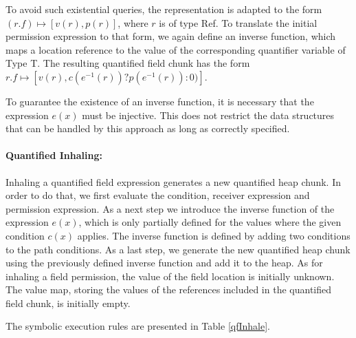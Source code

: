 \documentclass[12pt]{article}
\begin{document}
To avoid such existential queries, the representation is adapted to the form \((r.f) \mapsto [v(r), p(r)]\), where \(r\) is of type Ref. To translate the initial permission expression to that form, we again define an inverse function, which maps a location reference to the value of the corresponding quantifier variable of Type T. The resulting quantified field chunk has the form \(r.f \mapsto [v(r), c(e^{-1}(r)) ? p(e^{-1}(r)) : 0)]\). %

To guarantee the existence of an inverse function, it is necessary that the expression \(e(x)\) must be injective. This does not restrict the data structures that can be handled by this approach as long as correctly specified.\cite{isc}

\paragraph{Quantified Inhaling:}
Inhaling a quantified field expression generates a new quantified heap chunk. In order to do that, we first evaluate the condition, receiver expression and permission expression. As a next step we introduce the inverse function of the expression \(e(x)\), which is only partially defined for the values where the given condition \(c(x)\) applies. The inverse function is defined by adding two conditions to the path conditions. As a last step, we generate the new quantified heap chunk using the previously defined inverse function  and add it to the heap. As for inhaling a field permission, the value of the field location is initially unknown. The value map, storing the values of the references included in the quantified field chunk, is initially empty.

The symbolic execution rules are presented in Table \ref{qfInhale}.
\end{document}
